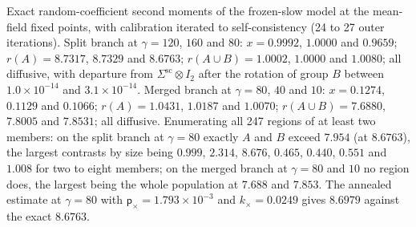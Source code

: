 \begin{numcheck}\label{chk:frm-exploration}
Exact random-coefficient second moments of the frozen-slow model at the mean-field fixed points, with calibration iterated to self-consistency (24 to 27 outer iterations). Split branch at $\gamma=120$, $160$ and $80$: $x=0.9992$, $1.0000$ and $0.9659$; $r(A)=8.7317$, $8.7329$ and $8.6763$; $r(A\cup B)=1.0002$, $1.0000$ and $1.0080$; all diffusive, with departure from $\Sigma^{\mathrm{sc}}\otimes I_2$ after the rotation of group $B$ between $1.0\times10^{-14}$ and $3.1\times10^{-14}$. Merged branch at $\gamma=80$, $40$ and $10$: $x=0.1274$, $0.1129$ and $0.1066$; $r(A)=1.0431$, $1.0187$ and $1.0070$; $r(A\cup B)=7.6880$, $7.8005$ and $7.8531$; all diffusive. Enumerating all 247 regions of at least two members: on the split branch at $\gamma=80$ exactly $A$ and $B$ exceed $7.954$ (at $8.6763$), the largest contrasts by size being $0.999$, $2.314$, $8.676$, $0.465$, $0.440$, $0.551$ and $1.008$ for two to eight members; on the merged branch at $\gamma=80$ and $10$ no region does, the largest being the whole population at $7.688$ and $7.853$. The annealed estimate at $\gamma=80$ with $\mathsf p_\times=1.793\times10^{-3}$ and $k_\times=0.0249$ gives $8.6979$ against the exact $8.6763$.
\end{numcheck}

